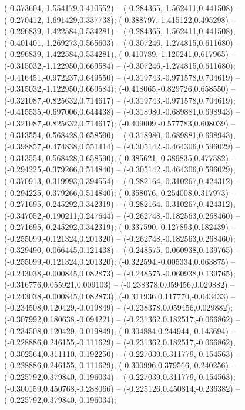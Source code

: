  (-0.373604,-1.554179,0.410552) -- (-0.284365,-1.562411,0.441508) -- (-0.270412,-1.691429,0.337738);
 (-0.388797,-1.415122,0.495298) -- (-0.296839,-1.422584,0.534281) -- (-0.284365,-1.562411,0.441508);
 (-0.401401,-1.269273,0.565603) -- (-0.307246,-1.274815,0.611680) -- (-0.296839,-1.422584,0.534281);
 (-0.410789,-1.120241,0.617965) -- (-0.315032,-1.122950,0.669584) -- (-0.307246,-1.274815,0.611680);
 (-0.416451,-0.972237,0.649550) -- (-0.319743,-0.971578,0.704619) -- (-0.315032,-1.122950,0.669584);
 (-0.418065,-0.829726,0.658550) -- (-0.321087,-0.825632,0.714617) -- (-0.319743,-0.971578,0.704619);
 (-0.415535,-0.697006,0.644438) -- (-0.318980,-0.689881,0.698943) -- (-0.321087,-0.825632,0.714617);
 (-0.409009,-0.577783,0.608039) -- (-0.313554,-0.568428,0.658590) -- (-0.318980,-0.689881,0.698943);
 (-0.398857,-0.474838,0.551414) -- (-0.305142,-0.464306,0.596029) -- (-0.313554,-0.568428,0.658590);
 (-0.385621,-0.389835,0.477582) -- (-0.294225,-0.379266,0.514840) -- (-0.305142,-0.464306,0.596029);
 (-0.370913,-0.319993,0.394554) -- (-0.282164,-0.310267,0.424312) -- (-0.294225,-0.379266,0.514840);
 (-0.358076,-0.254008,0.317973) -- (-0.271695,-0.245292,0.342319) -- (-0.282164,-0.310267,0.424312);
 (-0.347052,-0.190211,0.247644) -- (-0.262748,-0.182563,0.268460) -- (-0.271695,-0.245292,0.342319);
 (-0.337590,-0.127893,0.182439) -- (-0.255099,-0.121324,0.201320) -- (-0.262748,-0.182563,0.268460);
 (-0.329490,-0.066445,0.121438) -- (-0.248575,-0.060938,0.139765) -- (-0.255099,-0.121324,0.201320);
 (-0.322594,-0.005334,0.063875) -- (-0.243038,-0.000845,0.082873) -- (-0.248575,-0.060938,0.139765);
 (-0.316776,0.055921,0.009103) -- (-0.238378,0.059456,0.029882) -- (-0.243038,-0.000845,0.082873);
 (-0.311936,0.117770,-0.043433) -- (-0.234508,0.120429,-0.019849) -- (-0.238378,0.059456,0.029882);
 (-0.307992,0.180638,-0.094221) -- (-0.231362,0.182517,-0.066862) -- (-0.234508,0.120429,-0.019849);
 (-0.304884,0.244944,-0.143694) -- (-0.228886,0.246155,-0.111629) -- (-0.231362,0.182517,-0.066862);
 (-0.302564,0.311110,-0.192250) -- (-0.227039,0.311779,-0.154563) -- (-0.228886,0.246155,-0.111629);
 (-0.300996,0.379566,-0.240256) -- (-0.225792,0.379840,-0.196034) -- (-0.227039,0.311779,-0.154563);
 (-0.300159,0.450768,-0.288066) -- (-0.225126,0.450814,-0.236382) -- (-0.225792,0.379840,-0.196034);
